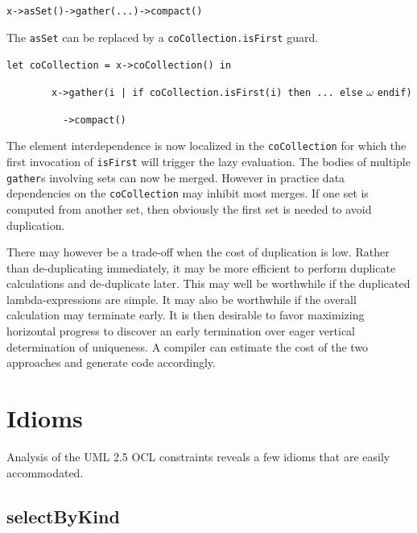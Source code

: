 \documentclass[
]{ceurart}
\begin{document}
\begin{description}[itemsep=-0.2cm]\small\begin{samepage}
\item \verb!x->asSet()->gather(...)->compact()!
\end{samepage}\end{description}

The \verb!asSet! can be replaced by a \verb!coCollection.isFirst! guard.

\begin{description}[itemsep=-0.2cm]\small\begin{samepage}
\item \verb!let coCollection = x->coCollection() in!
\item ~~~~~~~~\verb!x->gather(i | if coCollection.isFirst(i) then ... else! $\omega$ \verb!endif)!
\item ~~~~~~~~~~\verb!->compact()!
\end{samepage}\end{description}

The element interdependence is now localized in the \verb!coCollection! for which the first invocation of \verb!isFirst! will trigger the lazy evaluation. The bodies of multiple \verb!gather!s involving sets can now be merged. However in practice data dependencies on the \verb!coCollection! may inhibit most merges. If one set is computed from another set, then obviously the first set is needed to avoid duplication.

There may however be a trade-off when the cost of duplication is low. Rather than de-duplicating immediately, it may be more efficient to perform duplicate calculations and de-duplicate later. This may well be worthwhile if the duplicated lambda-expressions are simple. It may also be worthwhile if the overall calculation may terminate early. It is then desirable to favor maximizing horizontal progress to discover an early termination over eager vertical determination of uniqueness. A compiler can estimate the cost of the two approaches and generate code accordingly.

\section{Idioms}\label{Idioms}

Analysis of the UML 2.5 OCL constraints reveals a few idioms that are easily accommodated.

\subsection{selectByKind}
\end{document}
